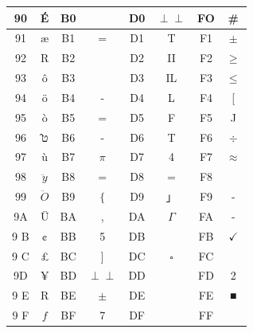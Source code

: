 \documentclass[10pt]{book}
\def\Perp{\perp\!\!\!\perp}
\begin{document}
\begin{center}
\begin{center}
\begin{center}
\begin{center}
\begin{center}
\begin{center}
\begin{tabular}{|c|c|c|c|c|c|c|c|}
\hline
90 & É & B0 &  & D0 & $\Perp$ & FO & \# \\
\hline
91 & æ & B1 & = & D1 & T & F1 & $\pm$ \\
\hline
92 & R & B2 &  & D2 & II & F2 & $\geq$ \\
\hline
93 & ô & B3 &  & D3 & IL & F3 & $\leq$ \\
\hline
94 & ö & B4 & - & D4 & L & F4 & [ \\
\hline
95 & ò & B5 & $=$ & D5 & F & F5 & J \\
\hline
96 & ט̂ & B6 & - & D6 & T & F6 & $\div$ \\
\hline
97 & ù & B7 & $\pi$ & D7 & 4 & F7 & $\approx$ \\
\hline
98 & $\ddot{y}$ & B8 & $=$ & D8 & = & F8 &  \\
\hline
99 & $\ddot{O}$ & B9 & $\{$ & D9 & 」 & F9 & - \\
\hline
9A & Ü & BA & , & DA & $\Gamma$ & FA & - \\
\hline
9 B & ¢ & BB & 5 & DB &  & FB & $\checkmark$ \\
\hline
9 C & £ & BC & ] & DC & $\square$ & FC &  \\
\hline
9D & ¥ & BD & $\Perp$ & DD &  & FD & 2 \\
\hline
9 E & R & BE & $\pm$ & DE &  & FE & ■ \\
\hline
9 F & $f$ & BF & 7 & DF &  & FF &  \\
\hline
\end{tabular}
\end{center}


\end{center}
\end{center}
\end{center}
\end{center}
\end{center}
\end{document}
